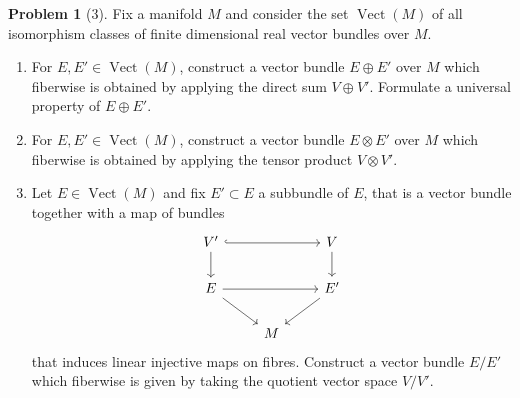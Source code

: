 \documentclass[reqno]{amsart}
\theoremstyle{definition}
\newtheorem{problem}[theorem]{Problem}
\theoremstyle{remark}
\DeclareMathOperator{\Vect}{Vect}
\begin{document}
\begin{problem}[3]
    Fix a manifold $M$ and consider the
    set $\Vect (M)$ of all isomorphism classes
    of finite dimensional real vector bundles over
     $M$.
     \begin{enumerate}
         \item For $E,E' \in \Vect(M)$, construct a 
             vector bundle $E \oplus E'$ over
             $M$ which fiberwise is obtained
             by applying the direct sum
             $V \oplus V'$. Formulate a
             universal property of $E \oplus E'$.
         \item For $E,E' \in \Vect(M)$, construct a
             vector bundle $E \otimes E'$ over
             $M$ which fiberwise is obtained
             by applying the tensor product
             $V \otimes V'$.
         \item Let $E \in \Vect(M)$ and fix
             $E' \subset E$ a subbundle of
             $E$, that is a vector bundle together with a
             map of bundles
             \begin{equation*}
             \begin{tikzcd}
                 V' \ar[rr, hookrightarrow]
                 \ar[d] & & V\ar[d] \\
                 E \ar[rr] \ar[dr] && E' \ar[dl]\\
                           & M &
             \end{tikzcd}
             \end{equation*}
             that induces linear injective maps
             on fibres. Construct a vector
             bundle $E / E'$ which fiberwise is given by
             taking the quotient vector space
             $V / V'$.
             
     \end{enumerate}
\end{problem}
\end{document}
